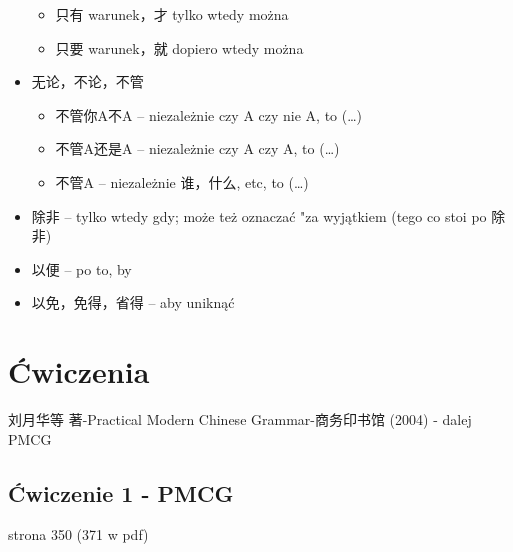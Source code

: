 \begin{itemize}
	\begin{itemize}
		\item 只有 warunek，才 tylko wtedy można
		\item 只要 warunek，就 dopiero wtedy można
	\end{itemize}
\item 无论，不论，不管
	\begin{itemize}
		\item 不管你A不A -- niezależnie czy A czy nie A, to (…)
		\item 不管A还是A -- niezależnie czy A czy A, to (…)
		\item 不管A -- niezależnie 谁，什么, etc, to (…)
	\end{itemize}
\item 除非 -- tylko wtedy gdy; może też oznaczać "za wyjątkiem (tego co stoi po
除非)
\item 以便 -- po to, by
\item 以免，免得，省得 -- aby uniknąć
\end{itemize}
\section{Ćwiczenia}
刘月华等 著-Practical Modern Chinese Grammar-商务印书馆
(2004) - dalej PMCG
﻿\subsection{Ćwiczenie 1 - PMCG}

strona 350 (371 w pdf)
 


